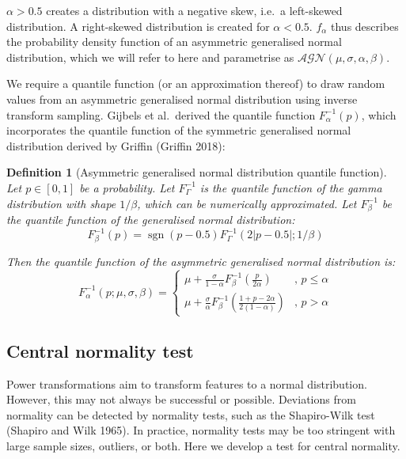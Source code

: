 \documentclass[
  a4paper,
]{article}
\newtheorem*{definition}{Definition}
\begin{document}
\(\alpha > 0.5\) creates a distribution with a negative skew, i.e.~a
left-skewed distribution. A right-skewed distribution is created for
\(\alpha < 0.5\). \(f_{\alpha}\) thus describes the probability density
function of an asymmetric generalised normal distribution, which we will
refer to here and parametrise as
\(\mathcal{AGN}\left(\mu, \sigma, \alpha, \beta \right)\).

We require a quantile function (or an approximation thereof) to draw
random values from an asymmetric generalised normal distribution using
inverse transform sampling. Gijbels et al.~derived the quantile function
\(F_{\alpha}^{-1}(p)\), which incorporates the quantile function of the
symmetric generalised normal distribution derived by Griffin (Griffin
2018):

\begin{definition}[Asymmetric generalised normal distribution quantile function]
Let $p \in \left[0, 1\right]$ be a probability.
Let  $F_{\Gamma}^{-1}$ is the quantile function of the gamma distribution with shape $1 / \beta$, which can be numerically approximated. 
Let $F_{\beta}^{-1}$ be the quantile function of the generalised normal distribution:
\begin{equation}
F_{\beta}^{-1}(p) = \mathop{\mathrm{sgn}}\left(p - 0.5 \right) F_{\Gamma}^{-1}\left(2 \left|p - 0.5 \right|; 1 / \beta \right)
\end{equation}

Then the quantile function of the asymmetric generalised normal distribution is:
\begin{equation}
F_{\alpha}^{-1}(p; \mu, \sigma, \beta) =
\begin{cases}
\mu + \frac{\sigma}{1 - \alpha} F_{\beta}^{-1} \left( \frac{p}{2 \alpha}\right) & \text{, } p \leq \alpha \\
\mu + \frac{\sigma}{\alpha} F_{\beta}^{-1} \left( \frac{1 + p - 2 \alpha}{2 \left(1 - \alpha \right)} \right) & \text{, } p > \alpha
\end{cases}
\end{equation}
\end{definition}

\subsection{Central normality test}\label{central-normality-test}

Power transformations aim to transform features to a normal
distribution. However, this may not always be successful or possible.
Deviations from normality can be detected by normality tests, such as
the Shapiro-Wilk test (Shapiro and Wilk 1965). In practice, normality
tests may be too stringent with large sample sizes, outliers, or both.
Here we develop a test for central normality.
\end{document}
